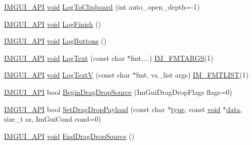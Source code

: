\begin{DoxyCompactItemize}
\item 
\hyperlink{imgui_8h_a43829975e84e45d1149597467a14bbf5}{I\+M\+G\+U\+I\+\_\+\+A\+PI} \hyperlink{imgui__impl__opengl3__loader_8h_ac668e7cffd9e2e9cfee428b9b2f34fa7}{void} \hyperlink{namespaceImGui_a70e12f01ecb65747c9a70b73555b6ec1}{Log\+To\+Clipboard} (int auto\+\_\+open\+\_\+depth=-\/1)
\item 
\hyperlink{imgui_8h_a43829975e84e45d1149597467a14bbf5}{I\+M\+G\+U\+I\+\_\+\+A\+PI} \hyperlink{imgui__impl__opengl3__loader_8h_ac668e7cffd9e2e9cfee428b9b2f34fa7}{void} \hyperlink{namespaceImGui_a2ebcd048d1ca025fb972e1c2e920e3f3}{Log\+Finish} ()
\item 
\hyperlink{imgui_8h_a43829975e84e45d1149597467a14bbf5}{I\+M\+G\+U\+I\+\_\+\+A\+PI} \hyperlink{imgui__impl__opengl3__loader_8h_ac668e7cffd9e2e9cfee428b9b2f34fa7}{void} \hyperlink{namespaceImGui_a7bd295da4be19bab98262c76fcaeb4fb}{Log\+Buttons} ()
\item 
\hyperlink{imgui_8h_a43829975e84e45d1149597467a14bbf5}{I\+M\+G\+U\+I\+\_\+\+A\+PI} \hyperlink{imgui__impl__opengl3__loader_8h_ac668e7cffd9e2e9cfee428b9b2f34fa7}{void} \hyperlink{namespaceImGui_aa548475d8f771ab6524d73d900a41198}{Log\+Text} (const char $\ast$fmt,...) \hyperlink{imgui_8h_a1251c2f9ddac0873dbad8181bd82c9f1}{I\+M\+\_\+\+F\+M\+T\+A\+R\+GS}(1)
\item 
\hyperlink{imgui_8h_a43829975e84e45d1149597467a14bbf5}{I\+M\+G\+U\+I\+\_\+\+A\+PI} \hyperlink{imgui__impl__opengl3__loader_8h_ac668e7cffd9e2e9cfee428b9b2f34fa7}{void} \hyperlink{namespaceImGui_a98df9ecc95235a208c834945c71df3a0}{Log\+TextV} (const char $\ast$fmt, va\+\_\+list args) \hyperlink{imgui_8h_a047693beb7f899f5deab1e20202016b3}{I\+M\+\_\+\+F\+M\+T\+L\+I\+ST}(1)
\item 
\hyperlink{imgui_8h_a43829975e84e45d1149597467a14bbf5}{I\+M\+G\+U\+I\+\_\+\+A\+PI} bool \hyperlink{namespaceImGui_ac2609b0f034d3bcd8d70d26df8694eaa}{Begin\+Drag\+Drop\+Source} (Im\+Gui\+Drag\+Drop\+Flags flags=0)
\item 
\hyperlink{imgui_8h_a43829975e84e45d1149597467a14bbf5}{I\+M\+G\+U\+I\+\_\+\+A\+PI} bool \hyperlink{namespaceImGui_a45f9694c878e79127c63d20d8955e07f}{Set\+Drag\+Drop\+Payload} (const char $\ast$\hyperlink{imgui__impl__opengl3__loader_8h_a63267399cd2a2ee217572c11d2e54f07}{type}, const \hyperlink{imgui__impl__opengl3__loader_8h_ac668e7cffd9e2e9cfee428b9b2f34fa7}{void} $\ast$\hyperlink{imgui__impl__opengl3__loader_8h_abd87654504355b4c1bb002dcb1d4d16a}{data}, size\+\_\+t sz, Im\+Gui\+Cond cond=0)
\item 
\hyperlink{imgui_8h_a43829975e84e45d1149597467a14bbf5}{I\+M\+G\+U\+I\+\_\+\+A\+PI} \hyperlink{imgui__impl__opengl3__loader_8h_ac668e7cffd9e2e9cfee428b9b2f34fa7}{void} \hyperlink{namespaceImGui_a02f225fefff2a046038ed99ab20606da}{End\+Drag\+Drop\+Source} ()

\end{DoxyCompactItemize}
